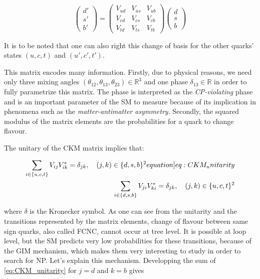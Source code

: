 \begin{equation}
    \begin{pmatrix}
        d' \\
        s' \\
        b'
    \end{pmatrix}
    =
    \begin{pmatrix}
        V_{ud} & V_{us} & V_{ub} \\
        V_{cd} & V_{cs} & V_{cb} \\
        V_{td} & V_{ts} & V_{tb}
    \end{pmatrix}
    \begin{pmatrix}
        d \\
        s \\
        b
    \end{pmatrix}
\end{equation}

It is to be noted that one can also right this change of basis for the other quarks' states $(u, c, t)$ and $(u', c', t')$.

This matrix encodes many information.
Firstly, due to physical reasons, we need only three mixing angles $\left(\theta_{12}, \theta_{13}, \theta_{23}\right) \in \mathbb{R}^3$ and one phase $\delta_{13} \in \mathbb{R}$ in order to fully parametrize this matrix.
The phase is interpreted as the \textit{CP-violating} phase and is an important parameter of the \gls{SM} to measure because of its implication in phenomena such as the \textit{matter-antimatter asymmetry}.
Secondly, the squared modulus of the matrix elements are the probabilities for a quark to change flavour.

The unitary of the \gls{CKM} matrix implies that:

\begin{align}
    \sum_{i \in \{u, c, t\}} V_{ij}V_{ik}^* =  \delta_{jk}, \quad \left(j, k\right) \in \{d, s, b\}^2 \label[equation]{eq:CKM_unitarity} \\ 
    \sum_{i \in \{d, s, b\}} V_{ji}V_{ki}^* = \delta_{jk}, \quad \left(j, k\right) \in \{u, c, t\}^2
\end{align}

where $\delta$ is the Kronecker symbol.
As one can see from the unitarity and the transitions represented by the matrix elements, change of flavour between same sign quarks, also called \gls{FCNC}, cannot occur at tree level.
It is possible at loop level, but the \gls{SM} predicts very low probabilities for these transitions, because of the \gls{GIM} mechanism, which makes them very interesting to study in order to search for \gls{NP}.
Let's explain this mechanism.
Developping the sum of \cref{eq:CKM_unitarity} for $j = d$ and $k = b$ gives

